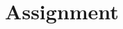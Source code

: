 \documentclass[journal,12pt,twocolumn]{IEEEtran}
\begin{document}
% 
\title{Assignment}
\maketitle
\tableofcontents
\renewcommand{\thefigure}{\theenumi}
\renewcommand{\thetable}{\theenumi}
\end{document}
